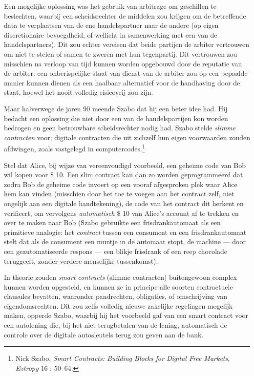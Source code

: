 \documentclass[
  a5paper,
  smalldemyvopaper,11pt,twoside,onecolumn,openright,extrafontsizes,
hidelinks]{memoir}
\begin{document}
Een mogelijke oplossing was het gebruik van arbitrage om geschillen te
beslechten, waarbij een scheidsrechter de middelen zou krijgen om de
betreffende data te verplaatsen van de ene handelspartner naar de andere
(op eigen discretionaire bevoegdheid, of wellicht in samenwerking met
een van de handelspartners). Dit zou echter vereisen dat beide partijen
de arbiter vertrouwen om niet te stelen of samen te zweren met hun
tegenpartij. Dit vertrouwen zou misschien na verloop van tijd kunnen
worden opgebouwd door de reputatie van de arbiter: een onberispelijke
staat van dienst van de arbiter zou op een bepaalde manier kunnen dienen
als een haalbaar alternatief voor de handhaving door de staat, hoewel
het nooit volledig risicovrij zou zijn.

Maar halverwege de jaren 90 meende Szabo dat hij een beter idee had. Hij
bedacht een oplossing die niet door een van de handelspartijen kon
worden bedrogen en geen betrouwbare scheidsrechter nodig had. Szabo
stelde \emph{slimme contracten} voor; digitale contracten die uit
zichzelf hun eigen voorwaarden zouden afdwingen, zoals vastgelegd in
computercodes.\footnote{Nick Szabo, \emph{Smart Contracts: Building
  Blocks for Digital Free Markets}, \emph{Extropy} 16 : 50--64.}

Stel dat Alice, bij wijze van vereenvoudigd voorbeeld, een geheime code
van Bob wil kopen voor \$ 10. Een slim contract kan dan zo worden
geprogrammeerd dat zodra Bob de geheime code invoert op een vooraf
afgesproken plek waar Alice hem kan vinden (misschien door het toe te
voegen aan het contract zelf, niet ongelijk aan een digitale
handtekening), de code van het contract dit herkent en verifieert, om
vervolgens \emph{automatisch} \$ 10 van Alice's account af te trekken en
over te maken naar Bob (Szabo gebruikte een frisdrankautomaat als een
primitieve analogie: het \emph{contract} tussen een consument en een
frisdrankautomaat stelt dat als de consument een muntje in de automaat
stopt, de machine --- door een geautomatiseerde respons --- een blikje
frisdrank of een reep chocolade teruggeeft, zonder verdere menselijke
tussenkomst).

In theorie zouden \emph{smart contracts} (slimme contracten)
buitengewoon complex kunnen worden opgesteld, en kunnen ze in principe
alle soorten contractuele clausules bevatten, waaronder pandrechten,
obligaties, of omschrijving van eigendomsrechten. Dit zou zelfs volledig
nieuwe zakelijke regelingen mogelijk maken, opperde Szabo, waarbij hij
het voorbeeld gaf van een smart contract voor een autolening die, bij
het niet terugbetalen van de lening, automatisch de controle over de
digitale autosleutels terug zou geven aan de bank.
\end{document}
